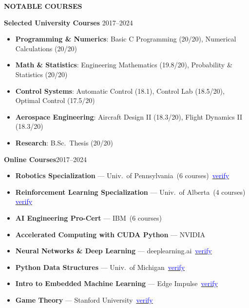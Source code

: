 \documentclass[12pt]{article}
\begin{document}
\begin{center}
	{\noindent \bfseries NOTABLE COURSES}
\end{center}

\noindent\textbf{Selected University Courses}%
\hfill 2017--2024\\
\vspace{-16pt}
\begin{itemize} \itemsep -2pt
  \item \textbf{Programming \& Numerics}: Basic C Programming (20/20), Numerical Calculations (20/20)
  \item \textbf{Math \& Statistics}: Engineering Mathematics (19.8/20), Probability \& Statistics (20/20)
  \item \textbf{Control Systems}: Automatic Control (18.1), Control Lab (18.5/20), Optimal Control (17.5/20)
  \item \textbf{Aerospace Engineering}: Aircraft Design II (18.3/20), Flight Dynamics II (18.3/20)
  \item \textbf{Research}: B.Sc.\ Thesis (20/20)
\end{itemize}

\noindent\textbf{Online Courses}\hfill 2017--2024\\
\vspace{-26pt}

\begin{itemize} \itemsep -2pt
  \item \textbf{Robotics Specialization} — Univ.\ of Pennsylvania\,
        (6 courses)\,
        \href{https://coursera.org/share/169250f50fb50f44b803162274217f86}{\textcolor{blue}{verify}}
  \item \textbf{Reinforcement Learning Specialization} — Univ.\ of Alberta\,
        (4 courses)\,
        \href{https://www.coursera.org/account/accomplishments/specialization/LWJMD8VB28PZ?utm_source=link&utm_medium=certificate&utm_content=cert_image&utm_campaign=sharing_cta&utm_product=s12n}{\textcolor{blue}{verify}}
  \item \textbf{AI Engineering Pro-Cert} — IBM\,
        (6 courses)
  \item \textbf{Accelerated Computing with CUDA Python} — NVIDIA
  \item \textbf{Neural Networks \& Deep Learning} — deeplearning.ai\,
        \href{https://coursera.org/share/8d9110917e9443857718534087a51190}{\textcolor{blue}{verify}}
  \item \textbf{Python Data Structures} — Univ.\ of Michigan\,
        \href{https://coursera.org/share/8944f2b056a3405c606e509e61f5570e}{\textcolor{blue}{verify}}
  \item \textbf{Intro to Embedded Machine Learning} — Edge Impulse\,
        \href{https://coursera.org/share/0b709e9d6305db689ca5018f1531f4ef}{\textcolor{blue}{verify}}
  \item \textbf{Game Theory} — Stanford University\,
        \href{https://coursera.org/share/7c342a051890483df7748d65ad0113c2}{\textcolor{blue}{verify}}
\end{itemize}
\end{document}
